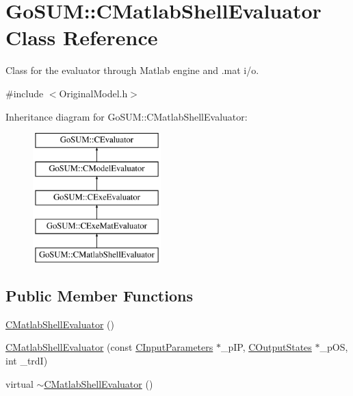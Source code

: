 \hypertarget{class_go_s_u_m_1_1_c_matlab_shell_evaluator}{\section{Go\-S\-U\-M\-:\-:C\-Matlab\-Shell\-Evaluator Class Reference}
\label{class_go_s_u_m_1_1_c_matlab_shell_evaluator}
}


Class for the evaluator through Matlab engine and .mat i/o.  




{\ttfamily \#include $<$Original\-Model.\-h$>$}

Inheritance diagram for Go\-S\-U\-M\-:\-:C\-Matlab\-Shell\-Evaluator\-:\begin{figure}[H]
\begin{center}
\leavevmode
\includegraphics[height=5.000000cm]{class_go_s_u_m_1_1_c_matlab_shell_evaluator}
\end{center}
\end{figure}
\subsection*{Public Member Functions}
\begin{DoxyCompactItemize}
\item 
\hyperlink{class_go_s_u_m_1_1_c_matlab_shell_evaluator_a088aee04655f2158447b5f7631a98ffe}{C\-Matlab\-Shell\-Evaluator} ()
\item 
\hyperlink{class_go_s_u_m_1_1_c_matlab_shell_evaluator_ab7903f6e9ed3ae3fe65321b72552d9f3}{C\-Matlab\-Shell\-Evaluator} (const \hyperlink{class_go_s_u_m_1_1_c_input_parameters}{C\-Input\-Parameters} $\ast$\-\_\-p\-I\-P, \hyperlink{class_go_s_u_m_1_1_c_output_states}{C\-Output\-States} $\ast$\-\_\-p\-O\-S, int \-\_\-trd\-I)
\item 
virtual \hyperlink{class_go_s_u_m_1_1_c_matlab_shell_evaluator_a389f589281db7684ba1671d4ea613f81}{$\sim$\-C\-Matlab\-Shell\-Evaluator} ()
\end{DoxyCompactItemize}
